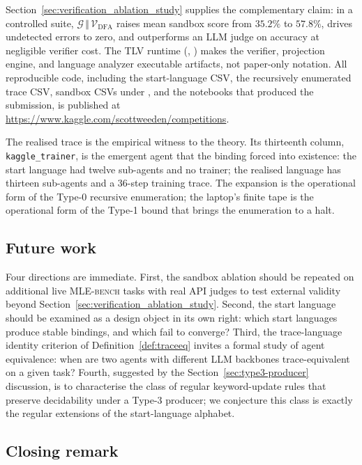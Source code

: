 Section~\ref{sec:verification_ablation_study} supplies the complementary
claim: in a controlled suite, $\mathcal{G}\,\Vert\,\mathcal{V}_{\mathrm{DFA}}$
raises mean sandbox score from $35.2\%$ to $57.8\%$, drives undetected
errors to zero, and outperforms an LLM judge on accuracy at negligible
verifier cost.  The TLV runtime (, ) makes the
verifier, projection engine, and language analyzer executable artifacts,
not paper-only notation.  All reproducible code, including the
start-language CSV, the recursively enumerated trace CSV, sandbox CSVs
under , and the notebooks that produced the submission, is
published at\\
\url{https://www.kaggle.com/scottweeden/competitions}.

The realised trace is the empirical witness to the theory.  Its
thirteenth column, \texttt{kaggle\_trainer}, is the emergent
agent that the binding forced into existence: the start language
had twelve sub-agents and no trainer; the realised language has
thirteen sub-agents and a 36-step training trace.  The expansion
is the operational form of the Type-0 recursive enumeration; the
laptop's finite tape is the operational form of the Type-1 bound
that brings the enumeration to a halt.

\subsection{Future work}

Four directions are immediate.  First, the sandbox ablation should
be repeated on additional live \textsc{MLE-bench} tasks with real API
judges to test external validity beyond
Section~\ref{sec:verification_ablation_study}.  Second, the start language should
be examined as a design object in its own right: which start
languages produce stable bindings, and which fail to converge?
Third, the trace-language identity criterion of
Definition~\ref{def:traceeq} invites a formal study of agent
equivalence: when are two agents with different LLM backbones
trace-equivalent on a given task?  Fourth, suggested by the
Section~\ref{sec:type3-producer} discussion, is to characterise
the class of regular keyword-update rules that preserve
decidability under a Type-3 producer; we conjecture this class
is exactly the regular extensions of the start-language alphabet.

\subsection{Closing remark}

